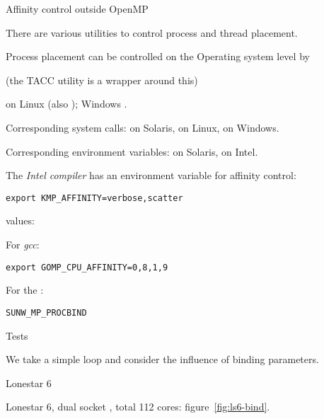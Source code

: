  {Affinity control outside OpenMP}

There are various utilities to control process and thread placement.

Process placement can be controlled on the Operating system level by
\begin{tacc}
(the TACC utility  is a wrapper around this)
\end{tacc}
on Linux (also ); Windows
.

Corresponding system calls:  on Solaris,
 on Linux,
 on Windows.

Corresponding environment variables:  on
Solaris,  on Intel.

The \emph{Intel compiler} has an
environment variable for affinity control:
\begin{verbatim}
export KMP_AFFINITY=verbose,scatter
\end{verbatim}
values: 

For \emph{gcc}:
\begin{verbatim}
export GOMP_CPU_AFFINITY=0,8,1,9
\end{verbatim}

For the :
\begin{verbatim}
SUNW_MP_PROCBIND
\end{verbatim}

 {Tests}
\label{sec:loop-affinity}

We take a simple loop and consider the influence of binding parameters.


 {Lonestar 6}

Lonestar 6, dual socket , total 112 cores:
figure~\ref{fig:ls6-bind}.

